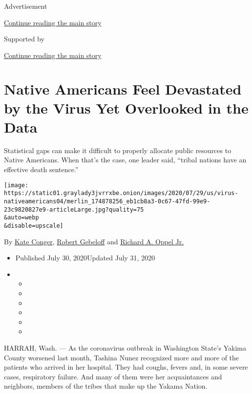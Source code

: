 Advertisement

\protect\hyperlink{after-top}{Continue reading the main story}

Supported by

\protect\hyperlink{after-sponsor}{Continue reading the main story}

\hypertarget{native-americans-feel-devastated-by-the-virus-yet-overlooked-in-the-data}{%
\section{Native Americans Feel Devastated by the Virus Yet Overlooked in
the
Data}\label{native-americans-feel-devastated-by-the-virus-yet-overlooked-in-the-data}}

Statistical gaps can make it difficult to properly allocate public
resources to Native Americans. When that's the case, one leader said,
``tribal nations have an effective death sentence.''

\texttt{[image: https://static01.graylady3jvrrxbe.onion/images/2020/07/29/us/virus-nativeamericans04/merlin\_174878256\_eb1cb8a3-0c67-47fd-99e9-23c9820827e9-articleLarge.jpg?quality=75\\\&auto=webp\\\&disable=upscale]}

By \href{https://www.nytimes3xbfgragh.onion/by/kate-conger}{Kate
Conger},
\href{https://www.nytimes3xbfgragh.onion/by/robert-gebeloff}{Robert
Gebeloff} and
\href{https://www.nytimes3xbfgragh.onion/by/richard-a-oppel-jr}{Richard
A. Oppel Jr.}

\begin{itemize}
\item
  Published July 30, 2020Updated July 31, 2020
\item
  \begin{itemize}
  \item
  \item
  \item
  \item
  \item
  \item
  \end{itemize}
\end{itemize}

HARRAH, Wash. --- As the coronavirus outbreak in Washington State's
Yakima County worsened last month, Tashina Nunez recognized more and
more of the patients who arrived in her hospital. They had coughs,
fevers and, in some severe cases, respiratory failure. And many of them
were her acquaintances and neighbors, members of the tribes that make up
the Yakama Nation.

